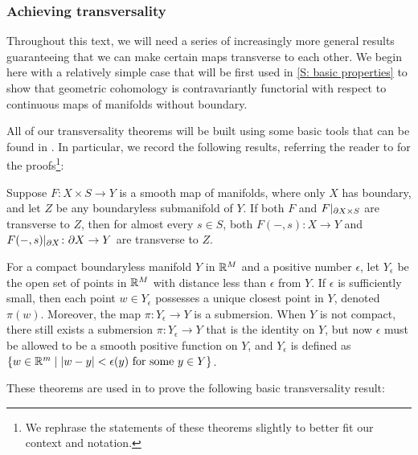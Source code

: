 \subsubsection{Achieving transversality}

Throughout this text, we will need a series of increasingly more general results guaranteeing that we can make certain maps transverse to each other.
We begin here with a relatively simple case that will be first used in \cref{S: basic properties} to show that geometric cohomology is contravariantly functorial with respect to continuous maps of manifolds without boundary.

All of our transversality theorems will be built using some basic tools that can be found in \cite[Section 2.3]{GuPo74}.
In particular, we record the following results, referring the reader to \cite[Section 2.3]{GuPo74} for the proofs\footnote{We rephrase the statements of these theorems slightly to better fit our context and notation.}:

\begin{theorem}\label{T: GP transversality}
	Suppose $F \colon X \times S \to Y$ is a smooth map of manifolds, where only $X$ has boundary, and let $Z$ be any boundaryless submanifold of $Y$.
	If both $F$ and $F|_{\partial X \times S}$ are transverse to $Z$, then for almost every $s \in S$, both $F(-,s) \colon X \to Y$ and $F(-,s)|_{\partial X} \colon \partial X \to Y$ are transverse to $Z$.
\end{theorem}

\begin{theorem}\label{T: epsilon neighborhood}
	For a compact boundaryless manifold $Y$ in $\mathbb{R}^M$ and a positive number $\epsilon$, let $Y_\epsilon$ be the open set of points in $\mathbb{R}^M$ with distance less than $\epsilon$ from $Y$.
	If $\epsilon$ is sufficiently small, then each point $w \in Y_\epsilon$ possesses a unique closest point in $Y$, denoted $\pi(w)$.
	Moreover, the map $\pi \colon Y_\epsilon \to Y$ is a submersion.
	When $Y$ is not compact, there still exists a submersion $\pi \colon Y_\epsilon \to Y$ that is the identity on $Y$, but now $\epsilon$ must be allowed to be a smooth positive function on $Y$, and $Y_\epsilon$ is defined as $\{w \in \mathbb{R}^m \mid |w-y|<\epsilon(y) \text{\ for some\ } y \in Y\}$.
\end{theorem}

These theorems are used in \cite{GuPo74} to prove the following basic transversality result:

